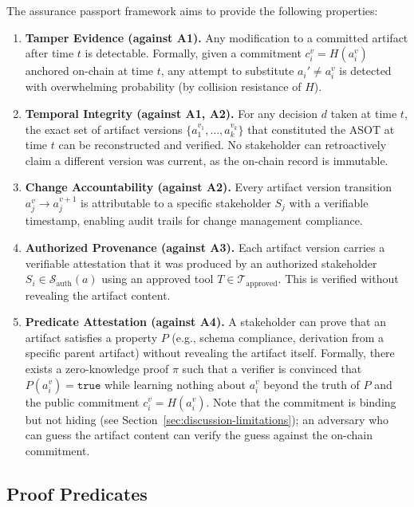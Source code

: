 The assurance passport framework aims to provide the following properties:

\begin{enumerate}
    \item \textbf{Tamper Evidence (against A1).} Any modification to a committed artifact after time $t$ is detectable. Formally, given a commitment $c_i^{v} = H(a_i^{v})$ anchored on-chain at time $t$, any attempt to substitute $a_i' \neq a_i^{v}$ is detected with overwhelming probability (by collision resistance of $H$).

    \item \textbf{Temporal Integrity (against A1, A2).} For any decision $d$ taken at time $t$, the exact set of artifact versions $\{a_1^{v_1}, \ldots, a_k^{v_k}\}$ that constituted the ASOT at time $t$ can be reconstructed and verified. No stakeholder can retroactively claim a different version was current, as the on-chain record is immutable.

    \item \textbf{Change Accountability (against A2).} Every artifact version transition $a_j^{v} \rightarrow a_j^{v+1}$ is attributable to a specific stakeholder $S_j$ with a verifiable timestamp, enabling audit trails for change management compliance.

    \item \textbf{Authorized Provenance (against A3).} Each artifact version carries a verifiable attestation that it was produced by an authorized stakeholder $S_i \in \mathcal{S}_{\text{auth}}(a)$ using an approved tool $T \in \mathcal{T}_{\text{approved}}$. This is verified without revealing the artifact content.

    \item \textbf{Predicate Attestation (against A4).} A stakeholder can prove that an artifact satisfies a property $P$ (e.g., schema compliance, derivation from a specific parent artifact) without revealing the artifact itself. Formally, there exists a zero-knowledge proof $\pi$ such that a verifier is convinced that $P(a_i^{v}) = \texttt{true}$ while learning nothing about $a_i^{v}$ beyond the truth of $P$ and the public commitment $c_i^{v} = H(a_i^{v})$. Note that the commitment is binding but not hiding (see Section~\ref{sec:discussion-limitations}); an adversary who can guess the artifact content can verify the guess against the on-chain commitment.
\end{enumerate}

\subsection{Proof Predicates}
\label{sec:proof-predicates}

